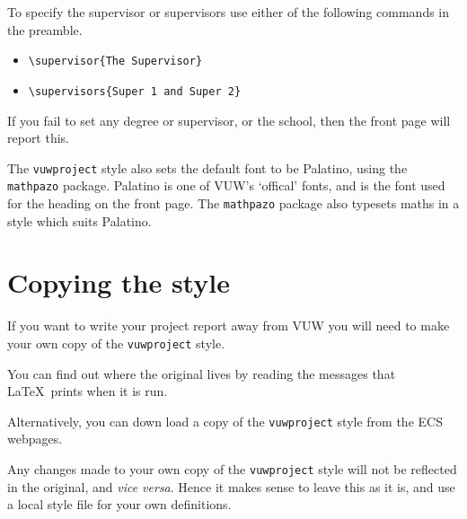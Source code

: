 To specify the supervisor or supervisors use either of the following commands in the preamble.
\begin{itemize}
\item \verb+\supervisor{The Supervisor}+
\item \verb+\supervisors{Super 1 and Super 2}+
\end{itemize}

If you fail to set any degree or supervisor, or the school, then the front page will report this.

The \texttt{vuwproject} style also sets the default font to be Palatino, using the \texttt{mathpazo} package. Palatino is one of VUW's `offical' fonts, and is the font used for the heading on the front page. The \texttt{mathpazo} package also typesets maths in a style which suits Palatino. 

\section{Copying the style}
If you want to write your project report away from VUW you will need to make your own copy of the \texttt{vuwproject} style.

You can find out where the original lives by reading the messages that \LaTeX\ prints when it is run.

Alternatively, you can down load a copy of the  \texttt{vuwproject} style from
the ECS webpages.

Any changes made to your own copy of the \texttt{vuwproject} style will not be reflected in the original, and \textit{vice versa}. Hence it makes sense to leave this as it is, and use a local style file for your own definitions.